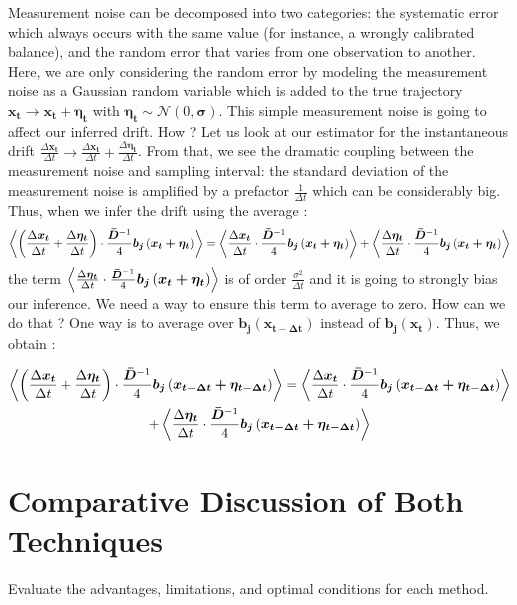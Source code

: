 Measurement noise can be decomposed into two categories: the systematic error which always occurs with the same value (for instance, a wrongly calibrated balance), and the random error that varies from one observation to another. Here, we are only considering the random error by modeling the measurement noise as a Gaussian random variable which is added to the true trajectory $\bm{x_t} \rightarrow \bm{x_t} + \bm{\eta_t}$ with $\bm{\eta_t} \sim \mathcal{N}(0, \bm{\sigma})$. This simple measurement noise is going to affect our inferred drift. How ? Let us look at our estimator for the instantaneous drift $\frac{\Delta \bm{x_t}}{\Delta{t}} \rightarrow \frac{\Delta \bm{x_t}}{\Delta{t}} + \frac{\Delta \bm{\eta_t}}{\Delta{t}}$. From that, we see the dramatic coupling between the measurement noise and sampling interval: the standard deviation of the measurement noise is amplified by a prefactor $\frac{1}{\Delta t}$ which can be considerably big. Thus, when we infer the drift using the average : 
\begin{equation}
    \left \langle \left(\frac{\Delta \bm{x_t}}{\Delta{t}} + \frac{\Delta \bm{\eta_t}}{\Delta{t}}\right)\cdot \frac{\bm{\bar{D}}^{-1}}{4}\bm{b_j}\left(\bm{x_t + \eta_t}\right) \right \rangle = \left \langle \frac{\Delta \bm{x_t}}{\Delta{t}} \cdot \frac{\bm{\bar{D}}^{-1}}{4}\bm{b_j}\left(\bm{x_t + \eta_t}\right) \right \rangle + \left \langle \frac{\Delta \bm{\eta_t}}{\Delta{t}}\cdot \frac{\bm{\bar{D}}^{-1}}{4}\bm{b_j}\left(\bm{x_t + \eta_t}\right) \right \rangle
\end{equation}
the term $\left \langle \frac{\Delta \bm{\eta_t}}{\Delta{t}}\cdot \frac{\bm{\bar{D}}^{-1}}{4}\bm{b_j}\left(\bm{x_t + \eta_t}\right) \right \rangle$ is of order $\frac{\sigma^2}{\Delta t}$ and it is going to strongly bias our inference. We need a way to ensure this term to average to zero. How can we do that ? One way is to average over $\bm{b_j}(\bm{x_{t-\Delta t}})$ instead of $\bm{b_j}(\bm{x_t})$. Thus, we obtain : 

\begin{multline*}
    \left \langle \left(\frac{\Delta \bm{x_t}}{\Delta{t}} + \frac{\Delta \bm{\eta_t}}{\Delta{t}}\right)\cdot \frac{\bm{\bar{D}}^{-1}}{4}\bm{b_j}\left(\bm{x_{t-\Delta t} + \eta_{t-\Delta t}}\right) \right \rangle = \left \langle \frac{\Delta \bm{x_{t}}}{\Delta{t}} \cdot \frac{\bm{\bar{D}}^{-1}}{4}\bm{b_j}\left(\bm{x_{t-\Delta t} + \eta_{t-\Delta t}}\right) \right \rangle \\
    + \left \langle \frac{\Delta \bm{\eta_t}}{\Delta{t}}\cdot \frac{\bm{\bar{D}}^{-1}}{4}\bm{b_j}\left(\bm{x_{t-\Delta t} + \eta_{t-\Delta t}}\right) \right \rangle
\end{multline*}


\section{Comparative Discussion of Both Techniques}
Evaluate the advantages, limitations, and optimal conditions for each method.


